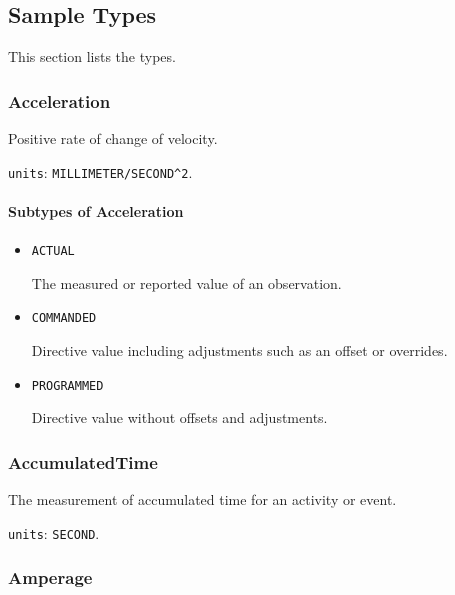 \subsection{Sample Types} \label{sec:Sample Types}


This section lists the  types.


\subsubsection{Acceleration}
\label{sec:Acceleration}



Positive rate of change of velocity.


\texttt{units}: \texttt{MILLIMETER/SECOND\^{}2}.

\paragraph{Subtypes of Acceleration}\mbox{}
\label{sec:Subtypes of Acceleration}

\begin{itemize}

\item \texttt{ACTUAL}


The measured or reported value of an \gls{observation}.

\item \texttt{COMMANDED}


Directive value including adjustments such as an offset or overrides.

\item \texttt{PROGRAMMED}


Directive value without offsets and adjustments.


\end{itemize}






\subsubsection{AccumulatedTime}
\label{sec:AccumulatedTime}



The measurement of accumulated time for an activity or event.


\texttt{units}: \texttt{SECOND}.


\subsubsection{Amperage}
\label{sec:Amperage}



